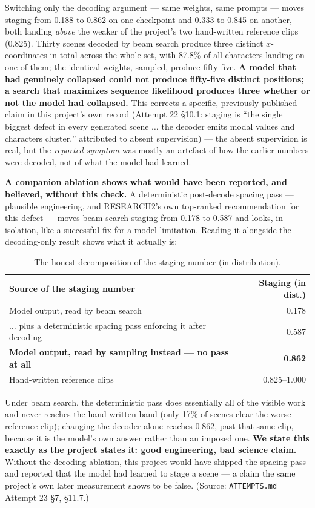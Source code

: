 \documentclass[11pt]{article}
\newcommand{\secsym}{\S}
\begin{document}
Switching only the decoding argument --- same weights, same prompts ---
moves staging from 0.188 to 0.862 on one checkpoint and 0.333 to 0.845 on
another, both landing \emph{above} the weaker of the project's two
hand-written reference clips (0.825). Thirty scenes decoded by beam search
produce three distinct $x$-coordinates in total across the whole set, with
87.8\% of all characters landing on one of them; the identical weights,
sampled, produce fifty-five. \textbf{A model that had genuinely collapsed
could not produce fifty-five distinct positions; a search that maximizes
sequence likelihood produces three whether or not the model had
collapsed.} This corrects a specific, previously-published claim in this
project's own record (Attempt 22 \secsym10.1: staging is ``the single
biggest defect in every generated scene $\ldots$ the decoder emits modal
values and characters cluster,'' attributed to absent supervision) --- the
absent supervision is real, but the \emph{reported symptom} was mostly an
artefact of how the earlier numbers were decoded, not of what the model
had learned.

\textbf{A companion ablation shows what would have been reported, and
believed, without this check.} A deterministic post-decode spacing pass
--- plausible engineering, and RESEARCH2's own top-ranked recommendation
for this defect --- moves beam-search staging from 0.178 to 0.587 and
looks, in isolation, like a successful fix for a model limitation. Reading
it alongside the decoding-only result shows what it actually is:

\begin{table}[h]
\centering
\caption{The honest decomposition of the staging number (in
distribution).}
\label{tab:honestdecomp}
\begin{tabular}{@{}L{7.5cm}r@{}}
\toprule
Source of the staging number & Staging (in dist.) \\
\midrule
Model output, read by beam search & 0.178 \\
$\ldots$ plus a deterministic spacing pass enforcing it after decoding & 0.587 \\
\textbf{Model output, read by sampling instead --- no pass at all} & \textbf{0.862} \\
Hand-written reference clips & 0.825--1.000 \\
\bottomrule
\end{tabular}
\end{table}

Under beam search, the deterministic pass does essentially all of the
visible work and never reaches the hand-written band (only 17\% of
scenes clear the worse reference clip); changing the decoder alone
reaches 0.862, past that same clip, because it is the model's own answer
rather than an imposed one. \textbf{We state this exactly as the project
states it: good engineering, bad science claim.} Without the decoding
ablation, this project would have shipped the spacing pass and reported
that the model had learned to stage a scene --- a claim the same
project's own later measurement shows to be false. (Source:
\texttt{ATTEMPTS.md} Attempt 23 \secsym7, \secsym11.7.)
\end{document}
